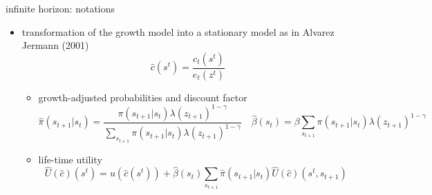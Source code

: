 \documentclass[9pt]{beamer}
\newcommand{\hc}{\hat{c}}
\newcommand{\hpi}{\hat{\pi}}
\newcommand{\hbeta}{\hat{\beta}}
\newcommand{\hU}{\hat{U}}
\theoremstyle{mystyle}
\begin{document}
\begin{frame}{infinite horizon: notations }
\begin{itemize}
\item transformation of the growth model into a stationary model as in Alvarez Jermann (2001)
\begin{equation*}
\hc(s^t) = \frac{c_t(s^t)}{e_t(z^t)}
\end{equation*}
\begin{itemize}
\item growth-adjusted probabilities and discount factor
\vspace{2mm}
\begin{equation*}
\hpi(s_{t+1}|s_t) = \frac{\pi(s_{t+1}|s_t)\lambda(z_{t+1})^{1-\gamma}}{\sum_{s_{t+1}}\pi(s_{t+1}|s_t)\lambda(z_{t+1})^{1-\gamma}}\quad \hbeta(s_t) = \beta\sum_{s_{t+1}}\pi(s_{t+1}|s_t)\lambda(z_{t+1})^{1-\gamma}
\end{equation*}
\item life-time utility
\begin{equation*}
\hU(\hc)(s^t) = u(\hc(s^t)) + \hbeta(s_t) \sum_{s_{t+1}}\hpi(s_{t+1}|s_t)\hU(\hc)(s^t,s_{t+1})
\end{equation*}
\end{itemize}
\end{itemize}
\end{frame}
%
\end{document}
